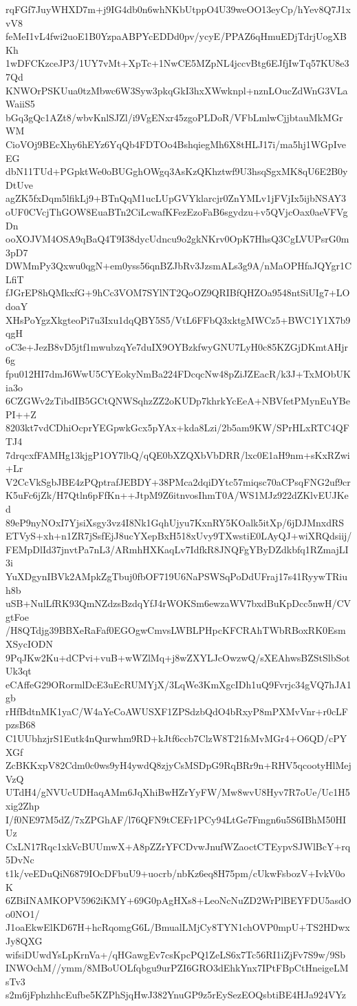 rqFGf7JuyWHXD7m+j9IG4db0n6whNKbUtppO4U39weOO13eyCp/hYev8Q7J1xvV8
feMeI1vL4fwi2uoE1B0YzpaABPYcEDDd0pv/ycyE/PPAZ6qHmuEDjTdrjUogXBKh
1wDFCKzceJP3/1UY7vMt+XpTc+1NwCE5MZpNL4jccvBtg6EJfjIwTq57KU8e37Qd
KNWOrPSKUua0tzMbwc6W3Syw3pkqGkI3hxXWwknpl+nznLOucZdWnG3VLaWaiiS5
bGq3gQc1AZt8/wbvKnlSJZl/i9VgENxr45zgoPLDoR/VFbLmlwCjjbtauMkMGrWM
CioVOj9BEcXhy6hEYz6YqQb4FDTOo4BshqiegMh6X8tHLJ17i/ma5hj1WGpIveEG
dbN11TUd+PGpktWe0oBUGghOWgq3AsKzQKhztwf9U3hsqSgxMK8qU6E2B0yDtUve
agZK5fxDqm5lfikLj9+BTnQqM1ucLUpGVYklarcjr0ZnYMLv1jFVjIx5ijbNSAY3
oUF0CVcjThGOW8EuaBTn2CiLcwafKFezEzoFaB6sgydzu+v5QVjcOax0aeVFVgDn
ooXOJVM4OSA9qBaQ4T9I38dycUdncu9o2gkNKrv0OpK7HhsQ3CgLVUPsrG0m3pD7
DWMmPy3Qxwu0qgN+em0yss56qnBZJbRv3JzsmALs3g9A/nMaOPHfaJQYgr1CLfiT
fJGrEP8hQMkxfG+9hCc3VOM7SYlNT2QoOZ9QRIBfQHZOa9548ntSiUIg7+LOdoaY
XHsPoYgzXkgteoPi7u3Ixu1dqQBY5S5/VtL6FFbQ3xktgMWCz5+BWC1Y1X7b9qgH
oC3e+JezB8vD5jtf1mwubzqYe7duIX9OYBzkfwyGNU7LyH0c85KZGjDKmtAHjr6g
fpu012HI7dmJ6WwU5CYEokyNmBa224FDcqcNw48pZiJZEacR/k3J+TxMObUKia3o
6CZGWv2zTibdIB5GCtQNWSqhzZZ2oKUDp7khrkYcEeA+NBVfetPMynEuYBePI++Z
8203kt7vdCDhiOcprYEGpwkGcx5pYAx+kda8Lzi/2b5am9KW/SPrHLxRTC4QFTJ4
7drqcxfFAMHg13kjgP1OY7lbQ/qQE0bXZQXbVbDRR/lxc0E1aH9nm+sKxRZwi+Lr
V2CcVkSgbJBE4zPQptrafJEBDY+38PMca2dqiDYtc57miqsc70aCPsqFNG2uf9cr
K5uFc6jZk/H7Qtln6pFfKn++JtpM9Z6itnvosIhmT0A/WS1MJz922dZKlvEUJKed
89eP9nyNOxI7YjsiXsgy3vz4I8Nk1GqhUjyu7KxnRY5KOalk5itXp/6jDJMnxdRS
ETVyS+xh+n1ZR7jSsfEjJ8ucYXepBxH518xUvy9TXwstiE0LAyQJ+wiXRQdsiij/
FEMpDlId37jnvtPa7nL3/ARmhHXKaqLv7IdfkR8JNQFgYByDZdkbfq1RZmajLI3i
YuXDgynIBVk2AMpkZgTbuj0fbOF719U6NaPSWSqPoDdUFraj17s41RyywTRiuh8b
uSB+NulLfRK93QmNZdzsBzdqYfJ4rWOKSm6ewzaWV7bxdBuKpDcc5nwH/CVgtFoe
/H8QTdjg39BBXeRaFaf0EGOgwCmvsLWBLPHpcKFCRAhTWbRBoxRK0EsmXSycIODN
9PqJKw2Ku+dCPvi+vuB+wWZlMq+j8wZXYLJcOwzwQ/sXEAhwsBZStSlbSotUk3qt
eCAffeG29ORormlDcE3uEcRUMYjX/3LqWe3KmXgcIDh1uQ9Fvrjc34gVQ7hJA1gb
rHfBdtnMK1yaC/W4aYeCoAWUSXF1ZPSdzbQdO4bRxyP8mPXMvVnr+r0cLFpzsB68
C1UUbhzjrS1Eutk4nQurwhm9RD+kJtf6ccb7ClzW8T21fsMvMGr4+O6QD/cPYXGf
ZcBKKxpV82Cdm0c0ws9yH4ywdQ8zjyCsMSDpG9RqBRr9n+RHV5qcootyHlMejVzQ
UTdH4/gNVUcUDHaqAMm6JqXhiBwHZrYyFW/Mw8wvU8Hyv7R7oUe/Uc1H5xig2Zhp
I/f0NE97M5dZ/7xZPGhAF/l76QFN9tCEFr1PCy94LtGe7Fmgn6u5S6IBhM50HIUz
CxLN17Rqc1xkVcBUUmwX+A8pZZrYFCDvwJnufWZaoctCTEypvSJWlBcY+rq5DvNc
t1k/veEDuQiN6879IOcDFbuU9+uocrb/nbKz6eq8H75pm/cUkwFsbozV+IvkV0oK
6ZBiINAMKOPV5962iKMY+69G0pAgHXs8+LeoNcNuZD2WrPlBEYFDU5asdOo0NO1/
J1oaEkwElKD67H+hcRqomgG6L/BmualLMjCy8TYN1chOVP0mpU+TS2HDwxJy8QXG
wifsiDUwdYsLpKrnVa+/qHGawgEv7csKpcPQ1ZeLS6x7Tc56RI1iZjFv7S9w/9Sb
INWOchM//ymm/8MBoUOLfqbgu9urPZI6GRO3dEhkYnx7IPtFBpCtHneigeLMsTv3
s2m6jFphzhhcEufbe5KZPhSjqHwJ382YnuGP9z5rEySezEOQsbtiBE4HJa924VYz
